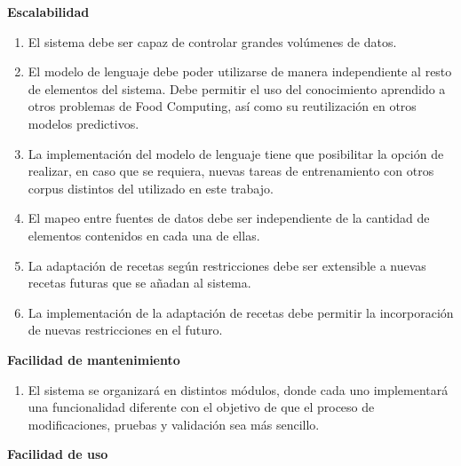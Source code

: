 \textbf{Escalabilidad}

\begin{enumerate}
    \item El sistema debe ser capaz de controlar grandes volúmenes de datos.%

    \item El modelo de lenguaje debe poder utilizarse de manera independiente al resto de elementos del sistema. Debe permitir el uso del conocimiento aprendido a otros problemas de Food Computing, así como su reutilización en otros modelos predictivos.
    
    \item La implementación del modelo de lenguaje tiene que posibilitar la opción de realizar, en caso que se requiera, nuevas tareas de entrenamiento con otros corpus distintos del utilizado en este trabajo.%
    
    \item El mapeo entre fuentes de datos debe ser independiente de la cantidad de elementos contenidos en cada una de ellas.%
    
    \item La adaptación de recetas según restricciones debe ser extensible a nuevas recetas futuras que se añadan al sistema.%
    
    \item La implementación de la adaptación de recetas debe permitir la incorporación de nuevas restricciones en el futuro.%
    
\end{enumerate}

\textbf{Facilidad de mantenimiento}

\begin{enumerate}
    \item El sistema se organizará en distintos módulos, donde cada uno implementará una funcionalidad diferente con el objetivo de que el proceso de modificaciones, pruebas y validación sea más sencillo.%
    
\end{enumerate}

\textbf{Facilidad de uso}

